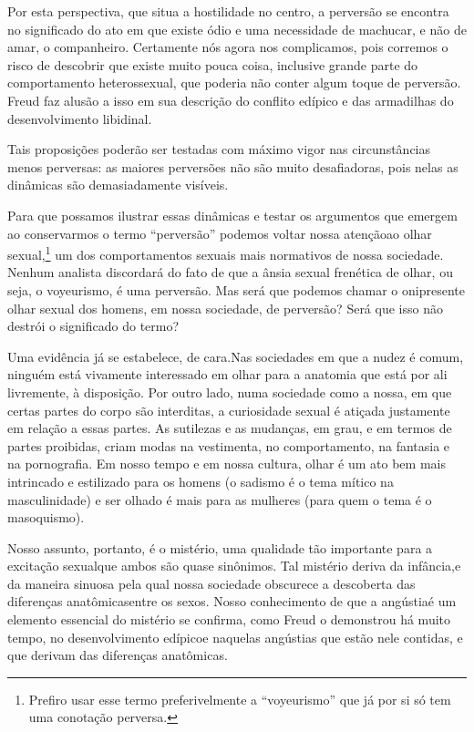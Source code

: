 Por esta perspectiva, que situa a hostilidade no centro, a perversão
se encontra no significado do ato em que existe ódio e uma necessidade
de machucar, e não de amar, o companheiro. Certamente nós agora nos
complicamos, pois corremos o risco de descobrir que existe muito pouca
coisa, inclusive grande parte do comportamento heterossexual, que
poderia não conter algum toque de perversão. Freud faz alusão a isso em
sua descrição do conflito\idxconfe{} edípico e das armadilhas do desenvolvimento\idxlibid{}
libidinal.

Tais proposições poderão ser testadas com máximo vigor nas
circunstâncias menos perversas: as maiores perversões não são muito
desafiadoras, pois nelas as dinâmicas são demasiadamente visíveis.

Para que possamos ilustrar essas dinâmicas e testar os argumentos
que emergem ao conservarmos o termo
``perversão'' podemos voltar nossa atenção\idxsexuo[|(]
ao olhar sexual,\footnote{ Prefiro usar esse termo preferivelmente a
``voyeurismo'' que já por si só tem uma
conotação perversa.} um dos comportamentos sexuais mais normativos de
nossa sociedade. Nenhum analista discordará do fato de que a ânsia
sexual frenética de olhar, ou seja, o voyeurismo, é uma perversão. Mas
será que podemos chamar o onipresente olhar sexual dos homens, em nossa
sociedade, de perversão? Será que isso não destrói o significado do
termo?

Uma evidência já se estabelece, de cara.\idxpervpredo[|(] Nas sociedades em que a
nudez é comum, ninguém está\idxsadiolha{} vivamente interessado em olhar para a
anatomia que está por ali livremente, à disposição. Por outro lado,
numa sociedade como a nossa, em que certas partes do corpo são
interditas, a curiosidade sexual é atiçada justamente em relação a
essas partes. As sutilezas e as mudanças, em grau, e em termos de
partes proibidas, criam modas na vestimenta, no comportamento, na
fantasia e na pornografia. Em nosso tempo e em nossa cultura, olhar é
um ato bem mais intrincado e estilizado para os homens (o sadismo é o
tema mítico na masculinidade) e ser olhado é mais para as mulheres
(para quem o tema é o masoquismo).

Nosso assunto, portanto, é o mistério,\idxgenetgenimist{} uma qualidade tão importante
para a excitação sexual\idxinfanexcit[|(] que ambos são quase sinônimos. Tal mistério
deriva da infância,\idxsexueinf[|(] e da maneira sinuosa pela qual nossa sociedade
obscurece a descoberta das diferenças anatômicas\idxsexuedif[|(] entre os sexos. Nosso
conhecimento de que a angústia\idxanguinfa[|(] é um elemento essencial do mistério se
confirma, como Freud o demonstrou há muito tempo, no desenvolvimento
edípico\idxconfemeni[|(] e naquelas angústias que estão nele contidas, e que derivam das
diferenças anatômicas.

